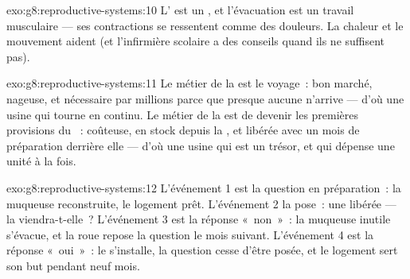 \begin{solution}{exo:g8:reproductive-systems:10}
L' est un , et l'évacuation est un travail musculaire
--- ses contractions se ressentent comme des douleurs. La chaleur et
le mouvement aident (et l'infirmière scolaire a des conseils quand
ils ne suffisent pas).
\end{solution}

\begin{solution}{exo:g8:reproductive-systems:11}
Le métier de la  est le voyage~: bon marché, nageuse, et
nécessaire par millions parce que presque aucune n'arrive --- d'où
une usine qui tourne en continu. Le métier de la  est de
devenir les premières provisions du ~: coûteuse, en stock
depuis la , et libérée avec un mois de préparation derrière
elle --- d'où une usine qui est un trésor, et qui dépense une unité
à la fois.
\end{solution}

\begin{solution}{exo:g8:reproductive-systems:12}
L'événement 1 est la question en préparation~: la muqueuse
reconstruite, le logement prêt. L'événement 2 la pose~: une  libérée --- la  viendra-t-elle~? L'événement 3 est la
réponse «~non~»~: la muqueuse inutile s'évacue, et la roue repose la
question le mois suivant. L'événement 4 est la réponse «~oui~»~: le
 s'installe, la question cesse d'être posée, et le logement
sert son but pendant neuf mois.
\end{solution}


